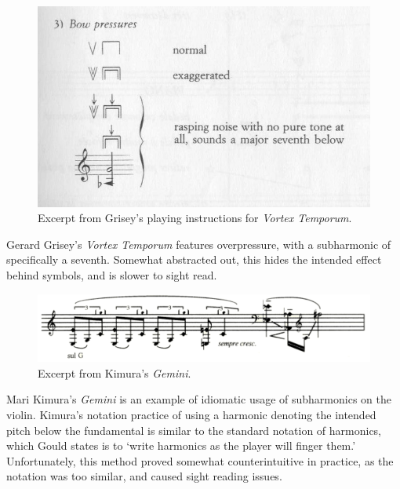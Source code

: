 \begin{figure}
    \includegraphics[width=\linewidth]{./resources/griseyVortexTemporum.jpg}
    \caption{Excerpt from Grisey's playing instructions for \emph{Vortex Temporum}.\autocite[]{griseyVortexTemporum}}
\label{fig:Excerpt from Grisey's playing instructions for Vortex Temporum}
  \end{figure}


Gerard Grisey's \emph{Vortex Temporum} features overpressure, with a subharmonic of specifically a seventh. Somewhat abstracted out, this hides the intended effect behind symbols, and is slower to sight read.

\begin{figure}
    \includegraphics[width=\linewidth]{./resources/kimura_gemini.png}
    \caption{Excerpt from Kimura's \emph{Gemini}.}
\label{fig:Excerpt from Kimura's Gemini}
  \end{figure}

  Mari Kimura's \emph{Gemini} is an example of idiomatic usage of subharmonics on the violin. Kimura's notation practice of using a harmonic denoting the intended pitch below the fundamental is similar to the standard notation of harmonics, which Gould states is to `write harmonics as the player will finger them.'\autocite[413]{gouldBars2011} Unfortunately, this method proved somewhat counterintuitive in practice, as the notation was too similar, and caused sight reading issues.

